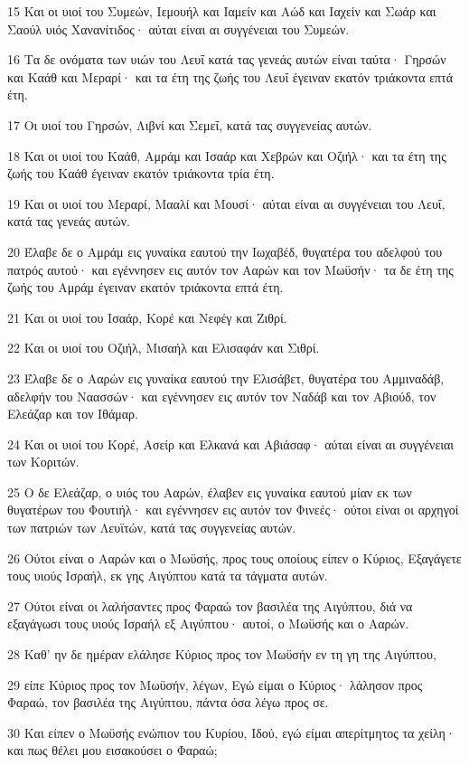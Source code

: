 \par 15 Και οι υιοί του Συμεών, Ιεμουήλ και Ιαμείν και Αώδ και Ιαχείν και Σωάρ και Σαούλ υιός Χανανίτιδος· αύται είναι αι συγγένειαι του Συμεών.
\par 16 Τα δε ονόματα των υιών του Λευΐ κατά τας γενεάς αυτών είναι ταύτα· Γηρσών και Καάθ και Μεραρί· και τα έτη της ζωής του Λευΐ έγειναν εκατόν τριάκοντα επτά έτη.
\par 17 Οι υιοί του Γηρσών, Λιβνί και Σεμεΐ, κατά τας συγγενείας αυτών.
\par 18 Και οι υιοί του Καάθ, Αμράμ και Ισαάρ και Χεβρών και Οζιήλ· και τα έτη της ζωής του Καάθ έγειναν εκατόν τριάκοντα τρία έτη.
\par 19 Και οι υιοί του Μεραρί, Μααλί και Μουσί· αύται είναι αι συγγένειαι του Λευΐ, κατά τας γενεάς αυτών.
\par 20 Έλαβε δε ο Αμράμ εις γυναίκα εαυτού την Ιωχαβέδ, θυγατέρα του αδελφού του πατρός αυτού· και εγέννησεν εις αυτόν τον Ααρών και τον Μωϋσήν· τα δε έτη της ζωής του Αμράμ έγειναν εκατόν τριάκοντα επτά έτη.
\par 21 Και οι υιοί του Ισαάρ, Κορέ και Νεφέγ και Ζιθρί.
\par 22 Και οι υιοί του Οζιήλ, Μισαήλ και Ελισαφάν και Σιθρί.
\par 23 Έλαβε δε ο Ααρών εις γυναίκα εαυτού την Ελισάβετ, θυγατέρα του Αμμιναδάβ, αδελφήν του Ναασσών· και εγέννησεν εις αυτόν τον Ναδάβ και τον Αβιούδ, τον Ελεάζαρ και τον Ιθάμαρ.
\par 24 Και οι υιοί του Κορέ, Ασείρ και Ελκανά και Αβιάσαφ· αύται είναι αι συγγένειαι των Κοριτών.
\par 25 Ο δε Ελεάζαρ, ο υιός του Ααρών, έλαβεν εις γυναίκα εαυτού μίαν εκ των θυγατέρων του Φουτιήλ· και εγέννησεν εις αυτόν τον Φινεές· ούτοι είναι οι αρχηγοί των πατριών των Λευϊτών, κατά τας συγγενείας αυτών.
\par 26 Ούτοι είναι ο Ααρών και ο Μωϋσής, προς τους οποίους είπεν ο Κύριος, Εξαγάγετε τους υιούς Ισραήλ, εκ γης Αιγύπτου κατά τα τάγματα αυτών.
\par 27 Ούτοι είναι οι λαλήσαντες προς Φαραώ τον βασιλέα της Αιγύπτου, διά να εξαγάγωσι τους υιούς Ισραήλ εξ Αιγύπτου· αυτοί, ο Μωϋσής και ο Ααρών.
\par 28 Καθ' ην δε ημέραν ελάλησε Κύριος προς τον Μωϋσήν εν τη γη της Αιγύπτου,
\par 29 είπε Κύριος προς τον Μωϋσήν, λέγων, Εγώ είμαι ο Κύριος· λάλησον προς Φαραώ, τον βασιλέα της Αιγύπτου, πάντα όσα λέγω προς σε.
\par 30 Και είπεν ο Μωϋσής ενώπιον του Κυρίου, Ιδού, εγώ είμαι απερίτμητος τα χείλη· και πως θέλει μου εισακούσει ο Φαραώ;

